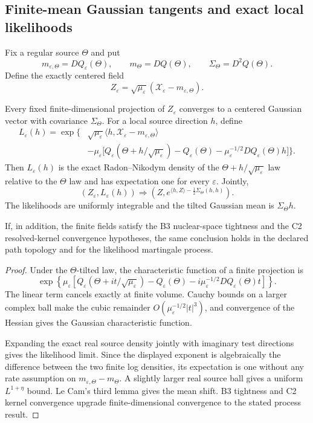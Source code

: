 \subsection{Finite-mean Gaussian tangents and exact local likelihoods}

Fix a regular source \(\Theta\) and put
\[
 m_{\varepsilon,\Theta}=DQ_\varepsilon(\Theta),
 \qquad
 m_\Theta=DQ(\Theta),
 \qquad
 \Sigma_\Theta=D^2Q(\Theta).
\]
Define the exactly centered field
\[
 Z_\varepsilon
 =\sqrt{\mu_\varepsilon}
 (\mathcal X_\varepsilon-m_{\varepsilon,\Theta}).
\]

\begin{theorem}
\label{thm:r3-d1-likelihood}
Every fixed finite-dimensional projection of \(Z_\varepsilon\) converges to a
centered Gaussian vector with covariance \(\Sigma_\Theta\).  For a local
source direction \(h\), define
\[
 \begin{aligned}
 L_\varepsilon(h)=\exp\Big\{&
 \sqrt{\mu_\varepsilon}
 \langle h,\mathcal X_\varepsilon-m_{\varepsilon,\Theta}\rangle\\
 &-\mu_\varepsilon\big[
 Q_\varepsilon(\Theta+h/\sqrt{\mu_\varepsilon})
 -Q_\varepsilon(\Theta)
 -\mu_\varepsilon^{-1/2}DQ_\varepsilon(\Theta)h
 \big]\Big\}.
 \end{aligned}
\]
Then \(L_\varepsilon(h)\) is the exact Radon--Nikodym density of the
\(\Theta+h/\sqrt{\mu_\varepsilon}\) law relative to the \(\Theta\) law and
has expectation one for every \(\varepsilon\).  Jointly,
\[
 (Z_\varepsilon,L_\varepsilon(h))
 \Rightarrow
 \left(Z,
 e^{\langle h,Z\rangle-\frac12\Sigma_\Theta(h,h)}
 \right).
\]
The likelihoods are uniformly integrable and the tilted Gaussian mean is
\(\Sigma_\Theta h\).

If, in addition, the finite fields satisfy the B3 nuclear-space tightness and
the C2 resolved-kernel convergence hypotheses, the same conclusion holds in
the declared path topology and for the likelihood martingale process.
\end{theorem}

\begin{proof}
Under the \(\Theta\)-tilted law, the characteristic function of a finite
projection is
\[
 \exp\left\{
 \mu_\varepsilon\left[
 Q_\varepsilon(\Theta+i t/\sqrt{\mu_\varepsilon})
 -Q_\varepsilon(\Theta)
 -i\mu_\varepsilon^{-1/2}DQ_\varepsilon(\Theta)t
 \right]\right\}.
\]
The linear term cancels exactly at finite volume.  Cauchy bounds on a larger
complex ball make the cubic remainder
\(O(\mu_\varepsilon^{-1/2}|t|^3)\), and convergence of the Hessian gives the
Gaussian characteristic function.

Expanding the exact real source density jointly with imaginary test directions
gives the likelihood limit.  Since the displayed exponent is algebraically
the difference between the two finite log densities, its expectation is one
without any rate assumption on
\(m_{\varepsilon,\Theta}-m_\Theta\).  A slightly larger real source ball gives
a uniform \(L^{1+\eta}\) bound.  Le Cam's third lemma gives the mean shift.
B3 tightness and C2 kernel convergence upgrade finite-dimensional convergence
to the stated process result.
\end{proof}

